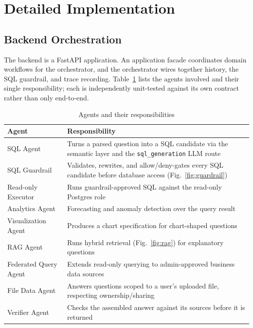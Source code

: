 \documentclass[conference]{IEEEtran}
\begin{document}
\section{Detailed Implementation}
\label{sec:implementation}

\subsection{Backend Orchestration}

The backend is a FastAPI application. An application facade coordinates
domain workflows for the orchestrator, and the orchestrator wires together
history, the SQL guardrail, and trace recording. Table~\ref{tab:agents}
lists the agents involved and their single responsibility; each is
independently unit-tested against its own contract rather than only
end-to-end.

\begin{table}[t]
\centering
\caption{Agents and their responsibilities}
\label{tab:agents}
\footnotesize
\begin{tabular}{@{}p{2.1cm}p{5.5cm}@{}}
\toprule
\textbf{Agent} & \textbf{Responsibility} \\
\midrule
SQL Agent & Turns a parsed question into a SQL candidate via the semantic layer and the \texttt{sql\_generation} LLM route \\
SQL Guardrail & Validates, rewrites, and allow/deny-gates every SQL candidate before database access (Fig.~\ref{fig:guardrail}) \\
Read-only Executor & Runs guardrail-approved SQL against the read-only Postgres role \\
Analytics Agent & Forecasting and anomaly detection over the query result \\
Visualization Agent & Produces a chart specification for chart-shaped questions \\
RAG Agent & Runs hybrid retrieval (Fig.~\ref{fig:rag}) for explanatory questions \\
Federated Query Agent & Extends read-only querying to admin-approved business data sources \\
File Data Agent & Answers questions scoped to a user's uploaded file, respecting ownership/sharing \\
Verifier Agent & Checks the assembled answer against its sources before it is returned \\
\bottomrule
\end{tabular}
\end{table}
\end{document}
